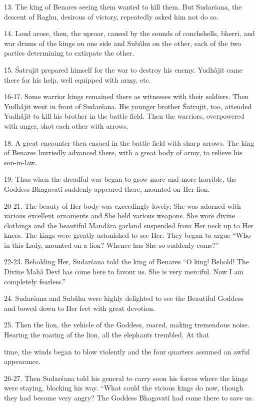 13. The king of Benares seeing them wanted to kill them. But Sudar\'sana, the descent of Raghu, desirous of victory, repeatedly asked him not do so.

14. Loud arose, then, the uproar, caused by the sounds of conchshells, bherri, and war drums of the kings on one side and Sub\^ahu on the other, each of the two parties determining to extirpate the other.

15. \'Satrujit prepared himself for the war to destroy his enemy. Yudh\^ajit came there for his help, well equipped with army, etc.

16-17. Some warrior kings remained there as witnesses with their soldiers. Then Yudh\^ajit went in front of Sudar\'sana. His younger brother \'Satrujit, too, attended Yudh\^ajit to kill his brother in the battle field. Then the warriors, overpowered with anger, shot each other with arrows.

18. A great encounter then ensued in the battle field with sharp arrows. The king of Benares hurriedly advanced there, with a great body of army, to relieve his son-in-law.

19. Thus when the dreadful war began to grow more and more horrible, the Goddess Bhagavat\^i suddenly appeared there, mounted on Her lion.

20-21. The beauty of Her body was exceedingly lovely; She was adorned with various excellent ornaments and She held various weapons. She wore divine clothings and the beautiful Mand\^ara garland suspended from Her neck up to Her knees. The kings were greatly astonished to see Her. They began to argue ``Who in this Lady, mounted on a lion? Whence has She so suddenly come?''

22-23. Beholding Her, Sudar\'sana told the king of Benares ``O king! Behold! The Divine Mah\^a Dev\^i has come here to favour us. She is very merciful. Now I am completely fearless.''

24. Sudar\'sana and Sub\^ahu were highly delighted to see the Beautiful Goddess and bowed down to Her feet with great devotion.

25. Then the lion, the vehicle of the Goddess, roared, making tremendous noise. Hearing the roaring of the lion, all the elephants trembled. At that

time, the winds began to blow violently and the four quarters assumed an awful appearance.

26-27. Then Sudar\'sana told his general to carry soon his forces where the kings were staying, blocking his way. ``What could the vicious kings do now, though they had become very angry? The Goddess Bhagavat\^i had come there to save us.

